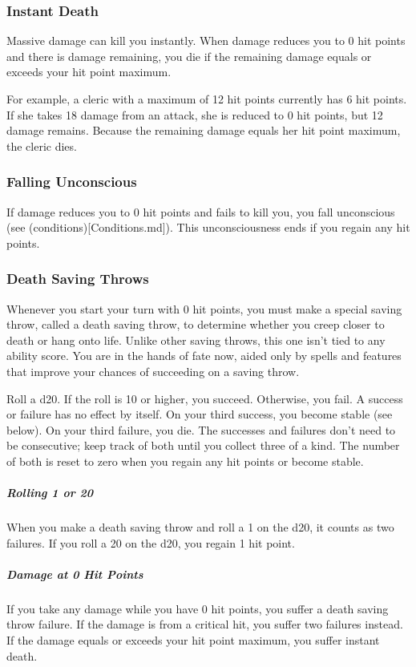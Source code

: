 \subsubsection{Instant Death}

Massive damage can kill you instantly. When damage reduces you to 0 hit points and there is damage remaining, you die if the remaining damage equals or exceeds your hit point maximum.

For example, a cleric with a maximum of 12 hit points currently has 6 hit points. If she takes 18 damage from an attack, she is reduced to 0 hit points, but 12 damage remains. Because the remaining damage equals her hit point maximum, the cleric dies.

\subsubsection{Falling Unconscious}

If damage reduces you to 0 hit points and fails to kill you, you fall unconscious (see (conditions)[Conditions.md]). This unconsciousness ends if you regain any hit points.

\subsubsection{Death Saving Throws}

Whenever you start your turn with 0 hit points, you must make a special saving throw, called a death saving throw, to determine whether you creep closer to death or hang onto life. Unlike other saving throws, this one isn't tied to any ability score. You are in the hands of fate now, aided only by spells and features that improve your chances of succeeding on a saving throw.

Roll a d20. If the roll is 10 or higher, you succeed. Otherwise, you fail. A success or failure has no effect by itself. On your third success, you become stable (see below). On your third failure, you die. The successes and failures don't need to be consecutive; keep track of both until you collect three of a kind. The number of both is reset to zero when you regain any hit points or become stable.

\subparagraph*{Rolling 1 or 20} When you make a death saving throw and roll a 1 on the d20, it counts as two failures. If you roll a 20 on the d20, you regain 1 hit point.

\subparagraph*{Damage at 0 Hit Points} If you take any damage while you have 0 hit points, you suffer a death saving throw failure. If the damage is from a critical hit, you suffer two failures instead. If the damage equals or exceeds your hit point maximum, you suffer instant death.

